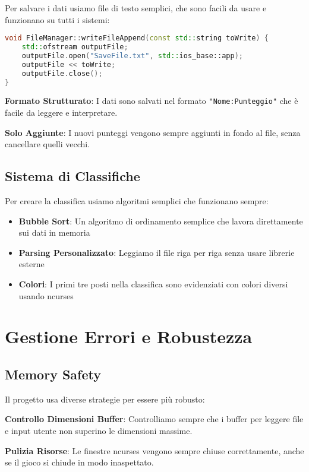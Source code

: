 \documentclass[a4paper,12pt]{article}
\begin{document}
Per salvare i dati usiamo file di testo semplici, che sono facili da usare e funzionano su tutti i sistemi:

\begin{lstlisting}[language=C++]
void FileManager::writeFileAppend(const std::string toWrite) {
    std::ofstream outputFile; 
    outputFile.open("SaveFile.txt", std::ios_base::app);
    outputFile << toWrite;
    outputFile.close();
}
\end{lstlisting}

\textbf{Formato Strutturato}: I dati sono salvati nel formato \texttt{"Nome:Punteggio"} che è facile da leggere e interpretare.

\textbf{Solo Aggiunte}: I nuovi punteggi vengono sempre aggiunti in fondo al file, senza cancellare quelli vecchi.

\subsection{Sistema di Classifiche}

Per creare la classifica usiamo algoritmi semplici che funzionano sempre:

\begin{itemize}
    \item \textbf{Bubble Sort}: Un algoritmo di ordinamento semplice che lavora direttamente sui dati in memoria
    \item \textbf{Parsing Personalizzato}: Leggiamo il file riga per riga senza usare librerie esterne
    \item \textbf{Colori}: I primi tre posti nella classifica sono evidenziati con colori diversi usando ncurses
\end{itemize}

\section{Gestione Errori e Robustezza}

\subsection{Memory Safety}

Il progetto usa diverse strategie per essere più robusto:

\textbf{Controllo Dimensioni Buffer}: Controlliamo sempre che i buffer per leggere file e input utente non superino le dimensioni massime.

\textbf{Pulizia Risorse}: Le finestre ncurses vengono sempre chiuse correttamente, anche se il gioco si chiude in modo inaspettato.
\end{document}
